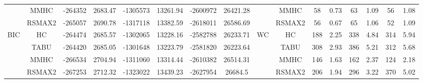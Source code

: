 \begin{table}[t]
{\begin{tabular}{cc||cc|cc|cc||cc|cc|cc|cc}
& MMHC &	-264352 & 	2683.47 & 	-1305573 & 	13261.94 & 	-2600972 & 	26421.28 & 	& MMHC &	58 & 	0.73 & 	63 & 	1.09 & 	56 & 	1.08\tabularnewline													
& RSMAX2 &	-265057 & 	2690.78 & 	-1317118 & 	13382.59 & 	-2618011 & 	26586.69 & 	& RSMAX2 &	56 & 	0.67 & 	65 & 	1.06 & 	52 & 	1.09\tabularnewline													
\hline																										
\multirow{4}{*}{BIC} & HC &	-264474 & 	2685.57 & 	-1302065 & 	13228.16 & 	-2582788 & 	26233.71 & 	\multirow{4}{*}{WC} & HC &	188 & 	2.25 & 	338 & 	4.84 & 	314 & 	5.94\tabularnewline													
& TABU &	-264420 & 	2685.05 & 	-1301648 & 	13223.79 & 	-2581820 & 	26223.64 & 	& TABU &	308 & 	2.93 & 	386 & 	5.21 & 	312 & 	5.68\tabularnewline													
& MMHC &	-266534 & 	2704.94 & 	-1311060 & 	13314.44 & 	-2610382 & 	26514.31 & 	& MMHC &	146 & 	1.63 & 	162 & 	2.37 & 	124 & 	2.18\tabularnewline													
& RSMAX2 &	-267253 & 	2712.32 & 	-1323022 & 	13439.23 & 	-2627954 & 	26684.5 & 	& RSMAX2 &	206 & 	1.94 & 	296 & 	3.22 & 	370 & 	5.02\tabularnewline													
\hline																										
\end{tabular}																										
}																										
\end{table}																										

{}\